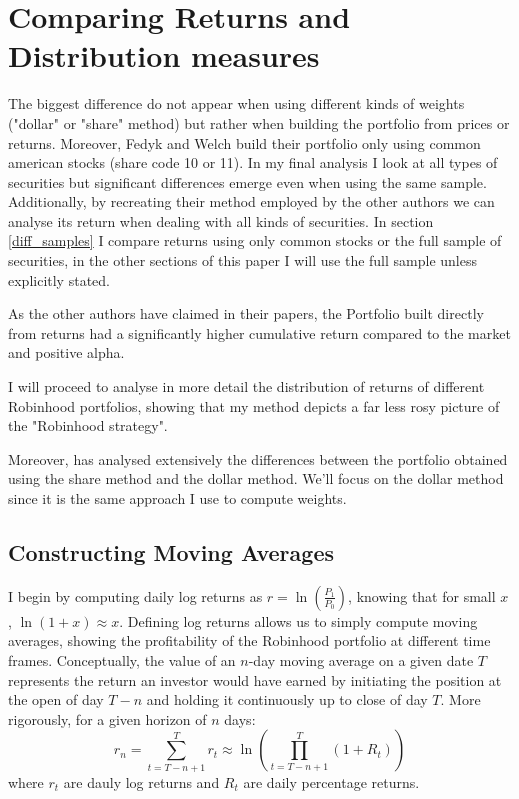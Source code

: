 
\section{Comparing Returns and Distribution measures}\label{return_section}
The biggest difference do not appear when using different kinds of weights ("dollar" or "share" method) but rather when building the portfolio from prices or returns. 
Moreover, Fedyk and Welch build their portfolio only using common american stocks (share code 10 or 11). 
In my final analysis I look at all types of securities but significant differences emerge even when using the same sample. 
Additionally, by recreating their method employed by the other authors we can analyse its return when dealing with all kinds of securities. 
In section \ref{diff_samples} I compare returns using only common stocks or the full sample of securities, in the other sections of this paper I will use the full sample unless explicitly stated.

As the other authors have claimed in their papers, the Portfolio built directly from returns had a significantly higher cumulative return compared to the market and positive alpha.

I will proceed to analyse in more detail the distribution of returns of different Robinhood portfolios, showing that my method depicts a far less rosy picture of the "Robinhood strategy".

Moreover, \cite{Fedyk2024} has analysed extensively the differences between the portfolio obtained using the share method and the dollar method. 
We'll focus on the dollar method since it is the same approach I use to compute weights.

\subsection{Constructing Moving Averages}
I begin by computing daily log returns as $r = \ln\left(\frac{P_1}{P_0}\right)$, knowing that for small $x$, $\ln(1+x)\approx x$. 
Defining log returns allows us to simply compute moving averages, showing the profitability of the Robinhood portfolio at different time frames.
Conceptually, the value of an $n$-day moving average on a given date $T$ represents the return an investor would have earned by initiating the position at the open of day $T-n$ and holding it continuously up to close of day $T$.
More rigorously, for a given horizon of $n$ days:
\begin{equation}
    r_n = \sum_{t=T-n+1}^{T} r_t \approx \ln \left( \prod_{t=T-n+1}^{T} (1+R_t) \right)
\end{equation}
where $r_t$ are dauly log returns and $R_t$ are daily percentage returns.


